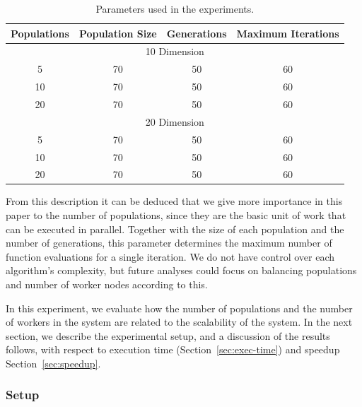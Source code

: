\documentclass[review]{elsarticle}
\begin{document}
\begin{table}[h!tbp]
  \small
  \caption{Parameters used in the experiments.
  }
  \label{tab:params:10}
  \vspace{0.25cm}
  \centering
  \small
  \begin{tabular}{|c|c|c|c|}
    \hline
      Populations & Population Size & Generations & Maximum Iterations  \\ \hline
                 \multicolumn{4}{|c|}{10 Dimension } \\ \hline
         5        &  70             &        50   &   60                \\ \hline
         10       &  70             &        50   &   60                \\ \hline
         20       &  70             &        50   &   60                \\ \hline
                  \multicolumn{4}{|c|}{20 Dimension } \\ \hline
         5        &  70             &        50   &   60                \\ \hline
         10       &  70             &        50   &   60                \\ \hline
         20       &  70             &        50   &   60                \\ \hline
  
  \end{tabular}
\end{table}



From this description it can be deduced that we give more importance in this
paper to the number of populations, since they are the basic unit of work that
can be executed in parallel. Together with the size of each population and the
number of generations, this parameter determines the maximum number of function
evaluations for a single iteration. We do not have control over each algorithm's
complexity, but future analyses could focus on balancing populations and number
of worker nodes according to this.

In this experiment, we evaluate how the number of populations and the number of
workers in the system are related to the scalability of the system. In the next
section, we describe the experimental setup, and a discussion of the results
follows, with respect to execution time (Section~\ref{sec:exec-time}) 
and speedup Section~\ref{sec:speedup}.

\subsubsection{Setup} %
\end{document}
